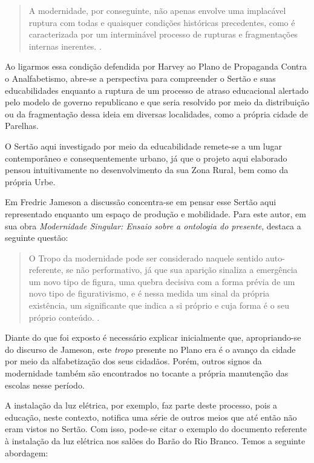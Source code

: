 \begin{refsection}
\begin{quotation}
    A modernidade, por conseguinte, não apenas envolve uma implacável ruptura com todas e quaisquer condições históricas precedentes, como é caracterizada por um interminável processo de rupturas e fragmentações internas inerentes. \cite[p.~22]{Harvey2002Condicao}.
\end{quotation}

Ao ligarmos essa condição defendida por Harvey ao Plano de Propaganda Contra o Analfabetismo, abre-se a perspectiva para compreender o Sertão e suas educabilidades enquanto a ruptura de um processo de atraso educacional alertado pelo modelo de governo republicano e que seria resolvido por meio da distribuição ou da fragmentação dessa ideia em diversas localidades, como a própria cidade de Parelhas.  

O Sertão aqui investigado por meio da educabilidade remete-se a um lugar contemporâneo e consequentemente urbano, já que o projeto aqui elaborado pensou intuitivamente no desenvolvimento da sua Zona Rural, bem como da própria Urbe.  

Em Fredric Jameson a discussão concentra-se em pensar esse Sertão aqui representado enquanto um espaço de produção e mobilidade. Para este autor, em sua obra \textit{Modernidade Singular: Ensaio sobre a ontologia do presente}, destaca a seguinte questão:

\begin{quotation}
    O Tropo da modernidade pode ser considerado naquele sentido auto-referente, se não performativo, já que sua aparição sinaliza a emergência um novo tipo de figura, uma quebra decisiva com a forma prévia de um novo tipo de figurativismo, e é nessa medida um sinal da própria existência, um significante que indica a si próprio e cuja forma é o seu próprio conteúdo. \cite[p.~45]{Jameson2005Modernidade}.
\end{quotation}

Diante do que foi exposto é necessário explicar inicialmente que, aproprian\-do-se do discurso de Jameson, este \textit{tropo} presente no Plano era é o avanço da cidade por meio da alfabetização dos seus cidadãos. Porém, outros signos da modernidade também são encontrados no tocante a própria manutenção das escolas nesse período. 

A instalação da luz elétrica, por exemplo, faz parte deste processo, pois a educação, neste contexto, notifica uma série de outros meios que até então não eram vistos no Sertão. Com isso, pode-se citar o exemplo do documento referente à instalação da luz elétrica nos salões do Barão do Rio Branco. Temos a seguinte abordagem:


\end{refsection}
